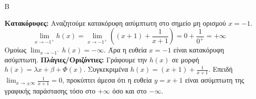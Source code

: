 \begin{thema}{Β}
\begin{erwthma}
\item \textbf{Κατακόρυφες:} Αναζητούμε κατακόρυφη ασύμπτωτη στο σημείο μη ορισμού $x = -1$.
\[ \lim_{x\to-1^+} h(x) = \lim_{x\to-1^+} \left( (x+1) + \frac{1}{x+1} \right) = 0 + \frac{1}{0^+} = +\infty \]
Ομοίως $\lim_{x\to-1^-} h(x) = -\infty$. Άρα η ευθεία $x = -1$ είναι κατακόρυφη ασύμπτωτη.
\textbf{Πλάγιες/Οριζόντιες:} Γράφουμε την $h(x)$ σε μορφή $h(x) = \lambda x + \beta + \Phi(x)$.
Συγκεκριμένα $h(x) = (x+1) + \frac{1}{x+1}$.
Επειδή $\lim_{x\to\pm\infty} \frac{1}{x+1} = 0$, προκύπτει άμεσα ότι η ευθεία $y = x+1$ είναι ασύμπτωτη της γραφικής παράστασης τόσο στο $+\infty$ όσο και στο $-\infty$.
\end{erwthma}
\end{thema}
